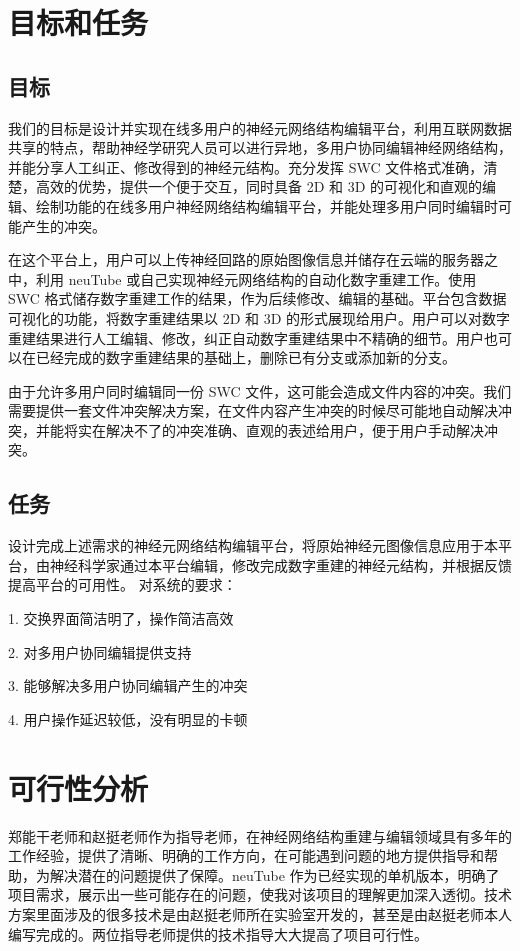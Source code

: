 \section{目标和任务}
\subsection{目标}
我们的目标是设计并实现在线多用户的神经元网络结构编辑平台，利用互联网数据共享的特点，帮助神经学研究人员可以进行异地，多用户协同编辑神经网络结构，并能分享人工纠正、修改得到的神经元结构。充分发挥 SWC 文件格式准确，清楚，高效的优势，提供一个便于交互，同时具备 2D 和 3D 的可视化和直观的编辑、绘制功能的在线多用户神经网络结构编辑平台，并能处理多用户同时编辑时可能产生的冲突。

在这个平台上，用户可以上传神经回路的原始图像信息并储存在云端的服务器之中，利用 neuTube 或自己实现神经元网络结构的自动化数字重建工作。使用 SWC 格式储存数字重建工作的结果，作为后续修改、编辑的基础。平台包含数据可视化的功能，将数字重建结果以 2D 和 3D 的形式展现给用户。用户可以对数字重建结果进行人工编辑、修改，纠正自动数字重建结果中不精确的细节。用户也可以在已经完成的数字重建结果的基础上，删除已有分支或添加新的分支。

由于允许多用户同时编辑同一份 SWC 文件，这可能会造成文件内容的冲突。我们需要提供一套文件冲突解决方案，在文件内容产生冲突的时候尽可能地自动解决冲突，并能将实在解决不了的冲突准确、直观的表述给用户，便于用户手动解决冲突。

\subsection{任务}
设计完成上述需求的神经元网络结构编辑平台，将原始神经元图像信息应用于本平台，由神经科学家通过本平台编辑，修改完成数字重建的神经元结构，并根据反馈提高平台的可用性。
对系统的要求：

1. 交换界面简洁明了，操作简洁高效

2. 对多用户协同编辑提供支持

3. 能够解决多用户协同编辑产生的冲突

4. 用户操作延迟较低，没有明显的卡顿

\section{可行性分析}
郑能干老师和赵挺老师作为指导老师，在神经网络结构重建与编辑领域具有多年的工作经验，提供了清晰、明确的工作方向，在可能遇到问题的地方提供指导和帮助，为解决潜在的问题提供了保障。neuTube 作为已经实现的单机版本，明确了项目需求，展示出一些可能存在的问题，使我对该项目的理解更加深入透彻。技术方案里面涉及的很多技术是由赵挺老师所在实验室开发的，甚至是由赵挺老师本人编写完成的。两位指导老师提供的技术指导大大提高了项目可行性。


